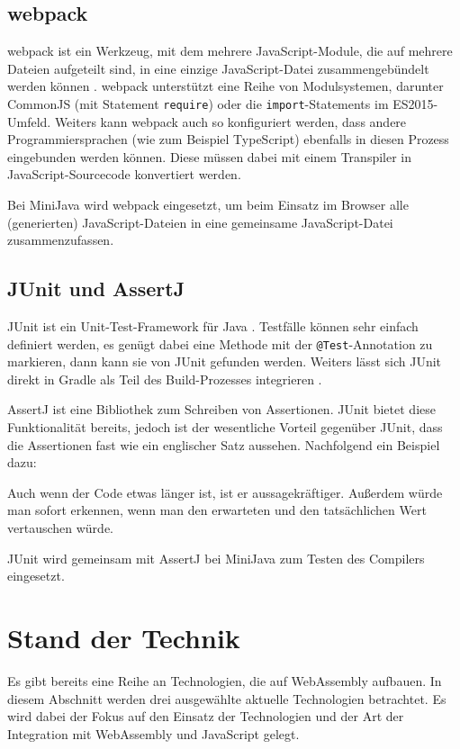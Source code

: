\subsection{webpack}
webpack ist ein Werkzeug, mit dem mehrere JavaScript-Module, die auf mehrere Dateien aufgeteilt sind, in eine einzige JavaScript-Datei zusammengebündelt werden können \cite{Webpack}. webpack unterstützt eine Reihe von Modulsystemen, darunter CommonJS (mit Statement \lstinline{require}) oder die \lstinline{import}-Statements im ES2015-Umfeld. Weiters kann webpack auch so konfiguriert werden, dass andere Programmiersprachen (wie zum Beispiel TypeScript) ebenfalls in diesen Prozess eingebunden werden können. Diese müssen dabei mit einem Transpiler in JavaScript-Sourcecode konvertiert werden.

Bei MiniJava wird webpack eingesetzt, um beim Einsatz im Browser alle (generierten) JavaScript-Dateien in eine gemeinsame JavaScript-Datei zusammenzufassen.

\subsection{JUnit und AssertJ}
JUnit ist ein Unit-Test-Framework für Java \cite{JUnit}. Testfälle können sehr einfach definiert werden, es genügt dabei eine Methode mit der \lstinline{@Test}-Annotation zu markieren, dann kann sie von JUnit gefunden werden. Weiters lässt sich JUnit direkt in Gradle als Teil des Build-Prozesses integrieren \cite{Gradle}.

AssertJ ist eine Bibliothek zum Schreiben von Assertionen. JUnit bietet diese Funktionalität bereits, jedoch ist der wesentliche Vorteil gegenüber JUnit, dass die Assertionen fast wie ein englischer Satz aussehen. Nachfolgend ein Beispiel dazu:



Auch wenn der Code etwas länger ist, ist er aussagekräftiger. Außerdem würde man sofort erkennen, wenn man den erwarteten und den tatsächlichen Wert vertauschen würde.

JUnit wird gemeinsam mit AssertJ bei MiniJava zum Testen des Compilers eingesetzt.

\section{Stand der Technik}
Es gibt bereits eine Reihe an Technologien, die auf WebAssembly aufbauen. In diesem Abschnitt werden drei ausgewählte aktuelle Technologien betrachtet. Es wird dabei der Fokus auf den Einsatz der Technologien und der Art der Integration mit WebAssembly und JavaScript gelegt.

